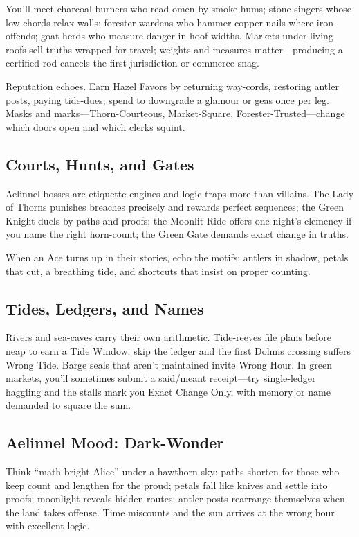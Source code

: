 \documentclass[11pt,letterpaper]{article}
\begin{document}
You'll meet charcoal-burners who read omen by smoke hums; stone-singers whose low chords relax walls; forester-wardens who hammer copper nails where iron offends; goat-herds who measure danger in hoof-widths. Markets under living roofs sell truths wrapped for travel; weights and measures matter---producing a certified rod cancels the first jurisdiction or commerce snag.

Reputation echoes. Earn Hazel Favors by returning way-cords, restoring antler posts, paying tide-dues; spend to downgrade a glamour or geas once per leg. Masks and marks---Thorn-Courteous, Market-Square, Forester-Trusted---change which doors open and which clerks squint.

\subsection*{Courts, Hunts, and Gates}

Aelinnel bosses are etiquette engines and logic traps more than villains. The Lady of Thorns punishes breaches precisely and rewards perfect sequences; the Green Knight duels by paths and proofs; the Moonlit Ride offers one night's clemency if you name the right horn-count; the Green Gate demands exact change in truths.

When an Ace turns up in their stories, echo the motifs: antlers in shadow, petals that cut, a breathing tide, and shortcuts that insist on proper counting.

\subsection*{Tides, Ledgers, and Names}

Rivers and sea-caves carry their own arithmetic. Tide-reeves file plans before neap to earn a Tide Window; skip the ledger and the first Dolmis crossing suffers Wrong Tide. Barge seals that aren't maintained invite Wrong Hour. In green markets, you'll sometimes submit a said/meant receipt---try single-ledger haggling and the stalls mark you Exact Change Only, with memory or name demanded to square the sum.

\subsection*{Aelinnel Mood: Dark-Wonder}

Think ``math-bright Alice'' under a hawthorn sky: paths shorten for those who keep count and lengthen for the proud; petals fall like knives and settle into proofs; moonlight reveals hidden routes; antler-posts rearrange themselves when the land takes offense. Time miscounts and the sun arrives at the wrong hour with excellent logic.
\end{document}
